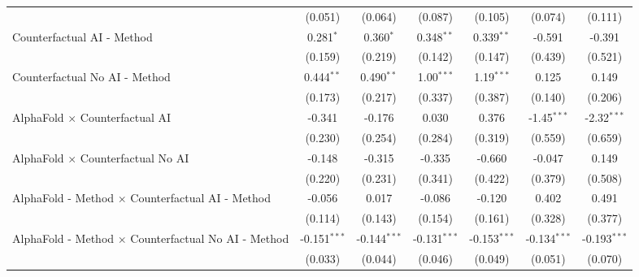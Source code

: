 \begin{tabular}{lcccccc}
                                                              & (0.051)        & (0.064)        & (0.087)        & (0.105)        & (0.074)        & (0.111)\\   
   Counterfactual AI - Method                                 & 0.281$^{*}$    & 0.360$^{*}$    & 0.348$^{**}$   & 0.339$^{**}$   & -0.591         & -0.391\\   
                                                              & (0.159)        & (0.219)        & (0.142)        & (0.147)        & (0.439)        & (0.521)\\   
   Counterfactual No AI - Method                              & 0.444$^{**}$   & 0.490$^{**}$   & 1.00$^{***}$   & 1.19$^{***}$   & 0.125          & 0.149\\   
                                                              & (0.173)        & (0.217)        & (0.337)        & (0.387)        & (0.140)        & (0.206)\\   
   AlphaFold $\times$ Counterfactual AI                       & -0.341         & -0.176         & 0.030          & 0.376          & -1.45$^{***}$  & -2.32$^{***}$\\   
                                                              & (0.230)        & (0.254)        & (0.284)        & (0.319)        & (0.559)        & (0.659)\\   
   AlphaFold $\times$ Counterfactual No AI                    & -0.148         & -0.315         & -0.335         & -0.660         & -0.047         & 0.149\\   
                                                              & (0.220)        & (0.231)        & (0.341)        & (0.422)        & (0.379)        & (0.508)\\   
   AlphaFold - Method $\times$ Counterfactual AI - Method     & -0.056         & 0.017          & -0.086         & -0.120         & 0.402          & 0.491\\   
                                                              & (0.114)        & (0.143)        & (0.154)        & (0.161)        & (0.328)        & (0.377)\\   
   AlphaFold - Method $\times$ Counterfactual No AI - Method  & -0.151$^{***}$ & -0.144$^{***}$ & -0.131$^{***}$ & -0.153$^{***}$ & -0.134$^{***}$ & -0.193$^{***}$\\   
                                                              & (0.033)        & (0.044)        & (0.046)        & (0.049)        & (0.051)        & (0.070)\\   

\end{tabular}
